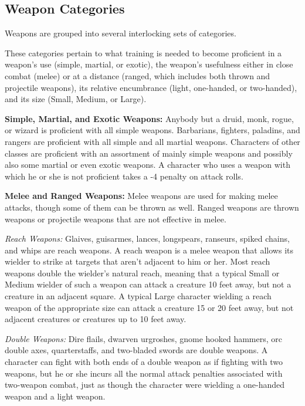 \subsection{Weapon Categories}

Weapons are grouped into several interlocking sets of categories.

These categories pertain to what training is needed to become proficient in a weapon's 
use (simple, martial, or exotic), the weapon's usefulness either in close combat 
(melee) or at a distance (ranged, which includes both thrown and projectile weapons), 
its relative encumbrance (light, one-handed, or two-handed), and its size (Small, 
Medium, or Large).

\textbf{Simple, Martial, and Exotic Weapons:} Anybody but a druid, monk, rogue, 
or wizard is proficient with all simple weapons. Barbarians, fighters, paladins, 
and rangers are proficient with all simple and all martial weapons. Characters 
of other classes are proficient with an assortment of mainly simple weapons and 
possibly also some martial or even exotic weapons. A character who uses a weapon 
with which he or she is not proficient takes a -4 penalty on attack rolls.

\textbf{Melee and Ranged Weapons:} Melee weapons are used for making melee attacks, 
though some of them can be thrown as well. Ranged weapons are thrown weapons or 
projectile weapons that are not effective in melee.

\textit{Reach Weapons:} Glaives, guisarmes, lances, longspears, ranseurs, spiked 
chains, and whips are reach weapons. A reach weapon is a melee weapon that allows 
its wielder to strike at targets that aren't adjacent to him or her. Most reach weapons
double the wielder's natural reach, meaning that a typical Small or Medium wielder 
of such a weapon can attack a creature 10 feet away, but not a creature in an adjacent 
square. A typical Large character wielding a reach weapon of the appropriate size 
can attack a creature 15 or 20 feet away, but not adjacent creatures or creatures 
up to 10 feet away.

\textit{Double Weapons:} Dire flails, dwarven urgroshes, gnome hooked hammers, 
orc double axes, quarterstaffs, and two-bladed swords are double weapons. A character 
can fight with both ends of a double weapon as if fighting with two weapons, but 
he or she incurs all the normal attack penalties associated with two-weapon combat, 
just as though the character were wielding a one-handed weapon and a light weapon.

